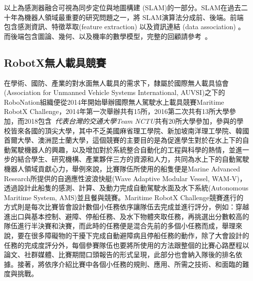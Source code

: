 以上為感測器融合可視為同步定位與地圖構建 (SLAM)的一部分。SLAM在過去二十年為機器人領域最重要的研究問題之一，將 SLAM演算法分成前、後端。前端包含感測資訊、特徵萃取(feature extraction) 以及資訊連結 (data association) 。而後端包含圖論、幾何、以及機率的數學模型，完整的回顧請參考~\cite{cadena2016past}。

\subsection{RobotX無人載具競賽}

在學術、國防、產業的對水面無人載具的需求下，隸屬於國際無人載具協會(Association for Unmanned Vehicle Systems International, AUVSI)之下的RoboNation組織便從2014年開始舉辦國際無人駕駛水上載具競賽Maritime RobotX Challenge，2014年第一次舉辦共有15所，2016第二次共有13所大學參加，而2018包含~\emph{代表台灣的交通大學Team NCTU}共有20所大學參加，參與的學校皆來各國的頂尖大學，其中不乏美國麻省理工學院、新加坡南洋理工學院、韓國首爾大學、澳洲昆士蘭大學，這個競賽的主要目的是為促進學生對於在水上下的自動駕駛機器人的興趣，以及增加對於系統整合自動化的工程與科學的熱情，並進一步的結合學生、研究機構、產業夥伴三方的資源和人力，共同為水上下的自動駕駛機器人領域貢獻心力，舉例來說，比賽隊伍所使用的船隻便是Marine Advanced Research所提供的自適應性波浪快艇(Wave Adaptive Modular Vessel, WAM-V)，透過設計此船隻的感測、計算、及動力完成自動駕駛水面及水下系統(Autonomous Maritime System, AMS)並且餐與競賽。Maritime RobotX Challenge競賽進行的方式則是每次比賽皆會設計數個小任務依序讓隊伍去完成並進行評分，例如：穿越進出口與基本控制、避障、停船任務、及水下物體夾取任務，再挑選出分數較高的隊伍進行半決賽和決賽，而此時的任務便是混合先前的多個小任務而成，舉理來說，要在很多障礙物的干擾下完成自動避障病且停船任務的動作，除了大會設計的任務的完成度評分外，每個參賽隊伍也要將所使用的方法跟整個的比賽心路歷程以論文、社群媒體、比賽期間口頭報告的形式呈現，此部分也會納入隊後的排名依據。接著，將依序介紹比賽中各個小任務的規則、應用、所需之技術、和面臨的難度與挑戰。


